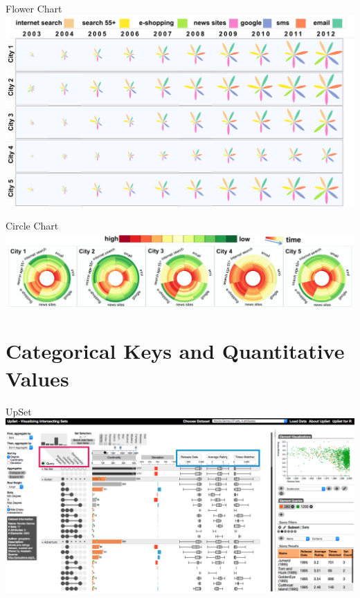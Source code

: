 \documentclass[xcolor={dvipsnames}]{beamer}
\begin{document}
\begin{frame}{Flower Chart \cite{albo_off_2016}}
\includegraphics[width=\textwidth]{figs/flower_anotated.png}
\end{frame}

\begin{frame}{Circle Chart\cite{albo_off_2016}}
\includegraphics[width=\textwidth]{figs/circle.png}
\end{frame}

\section{Categorical Keys and Quantitative Values}
\frame{\sectionpage}

\begin{frame}{UpSet\cite{lex_upset:_2014}}
\includegraphics[width=\textwidth]{figs/2014_infovis_upset_teaser.png}
\end{frame}
\end{document}
